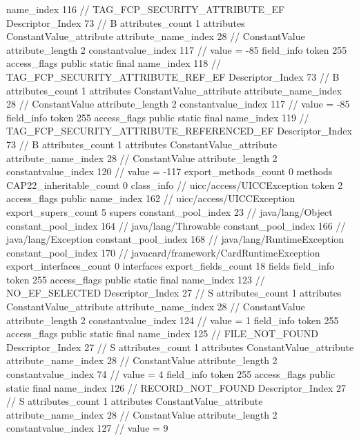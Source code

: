 {{{{{				name_index	116		// TAG_FCP_SECURITY_ATTRIBUTE_EF
				Descriptor_Index	73		// B
				attributes_count	1
				attributes {
				ConstantValue_attribute {
					attribute_name_index	28		// ConstantValue
					attribute_length	2
					constantvalue_index	117		// value = -85
				}
				}
			}
			field_info {
				token	255
				access_flags	public static final
				name_index	118		// TAG_FCP_SECURITY_ATTRIBUTE_REF_EF
				Descriptor_Index	73		// B
				attributes_count	1
				attributes {
				ConstantValue_attribute {
					attribute_name_index	28		// ConstantValue
					attribute_length	2
					constantvalue_index	117		// value = -85
				}
				}
			}
			field_info {
				token	255
				access_flags	public static final
				name_index	119		// TAG_FCP_SECURITY_ATTRIBUTE_REFERENCED_EF
				Descriptor_Index	73		// B
				attributes_count	1
				attributes {
				ConstantValue_attribute {
					attribute_name_index	28		// ConstantValue
					attribute_length	2
					constantvalue_index	120		// value = -117
				}
				}
			}
			}
			export_methods_count	0
			methods {
			}
			CAP22_inheritable_count	0
		}
		class_info {		// uicc/access/UICCException
			token	2
			access_flags	public
			name_index	162		// uicc/access/UICCException
			export_supers_count	5
			supers {
				constant_pool_index	23		// java/lang/Object
				constant_pool_index	164		// java/lang/Throwable
				constant_pool_index	166		// java/lang/Exception
				constant_pool_index	168		// java/lang/RuntimeException
				constant_pool_index	170		// javacard/framework/CardRuntimeException
			}
			export_interfaces_count	0
			interfaces {
			}
			export_fields_count	18
			fields {
			field_info {
				token	255
				access_flags	public static final
				name_index	123		// NO_EF_SELECTED
				Descriptor_Index	27		// S
				attributes_count	1
				attributes {
				ConstantValue_attribute {
					attribute_name_index	28		// ConstantValue
					attribute_length	2
					constantvalue_index	124		// value = 1
				}
				}
			}
			field_info {
				token	255
				access_flags	public static final
				name_index	125		// FILE_NOT_FOUND
				Descriptor_Index	27		// S
				attributes_count	1
				attributes {
				ConstantValue_attribute {
					attribute_name_index	28		// ConstantValue
					attribute_length	2
					constantvalue_index	74		// value = 4
				}
				}
			}
			field_info {
				token	255
				access_flags	public static final
				name_index	126		// RECORD_NOT_FOUND
				Descriptor_Index	27		// S
				attributes_count	1
				attributes {
				ConstantValue_attribute {
					attribute_name_index	28		// ConstantValue
					attribute_length	2
					constantvalue_index	127		// value = 9
}}}}}}}
